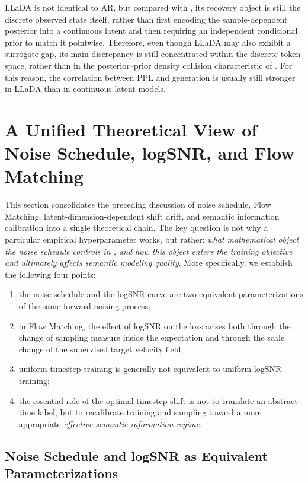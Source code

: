LLaDA is not identical to AR, but compared with \method, its recovery object is still the discrete observed state itself, rather than first encoding the sample-dependent posterior into a continuous latent and then requiring an independent conditional prior to match it pointwise. Therefore, even though LLaDA may also exhibit a surrogate gap, its main discrepancy is still concentrated within the discrete token space, rather than in the posterior--prior density collision characteristic of \method. For this reason, the correlation between PPL and generation is usually still stronger in LLaDA than in continuous latent models.

\section{A Unified Theoretical View of Noise Schedule, logSNR, and Flow Matching}
\label{app:noise_schedule_logsnr_fm}

This section consolidates the preceding discussion of noise schedule, Flow Matching, latent-dimension-dependent shift drift, and semantic information calibration into a single theoretical chain. The key question is not why a particular empirical hyperparameter works, but rather: \emph{what mathematical object the noise schedule controls in \method, and how this object enters the training objective and ultimately affects semantic modeling quality}. More specifically, we establish the following four points:
\begin{enumerate}
    \item the noise schedule and the logSNR curve are two equivalent parameterizations of the same forward noising process;
    \item in Flow Matching, the effect of logSNR on the loss arises both through the change of sampling measure inside the expectation and through the scale change of the supervised target velocity field;
    \item uniform-timestep training is generally not equivalent to uniform-logSNR training;
    \item the essential role of the optimal timestep shift is not to translate an abstract time label, but to recalibrate training and sampling toward a more appropriate \emph{effective semantic information regime}.
\end{enumerate}

\subsection{Noise Schedule and logSNR as Equivalent Parameterizations}
\label{app:noise_schedule_logsnr_equiv}


